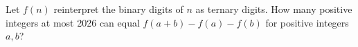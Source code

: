 Let $f(n)$ reinterpret the binary digits of $n$ as ternary digits. How many positive integers at most 2026 can equal $f(a+b)-f(a)-f(b)$ for positive integers $a,b$?
